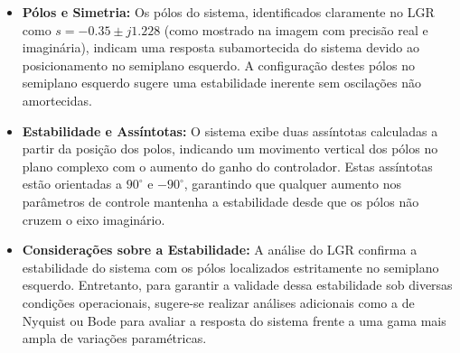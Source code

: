 \begin{itemize}
    \item \textbf{Pólos e Simetria:}
          Os pólos do sistema, identificados claramente no LGR como \( s = -0.35 \pm j1.228\) (como mostrado na imagem com precisão real e imaginária), indicam uma resposta subamortecida do sistema devido ao posicionamento no semiplano esquerdo. A configuração destes pólos no semiplano esquerdo sugere uma estabilidade inerente sem oscilações não amortecidas.
          
    \item \textbf{Estabilidade e Assíntotas:}
          O sistema exibe duas assíntotas calculadas a partir da posição dos polos, indicando um movimento vertical dos pólos no plano complexo com o aumento do ganho do controlador. Estas assíntotas estão orientadas a \(90^\circ\) e \(-90^\circ\), garantindo que qualquer aumento nos parâmetros de controle mantenha a estabilidade desde que os pólos não cruzem o eixo imaginário.

    \item \textbf{Considerações sobre a Estabilidade:}
          A análise do LGR confirma a estabilidade do sistema com os pólos localizados estritamente no semiplano esquerdo. Entretanto, para garantir a validade dessa estabilidade sob diversas condições operacionais, sugere-se realizar análises adicionais como a de Nyquist ou Bode para avaliar a resposta do sistema frente a uma gama mais ampla de variações paramétricas.
\end{itemize}



